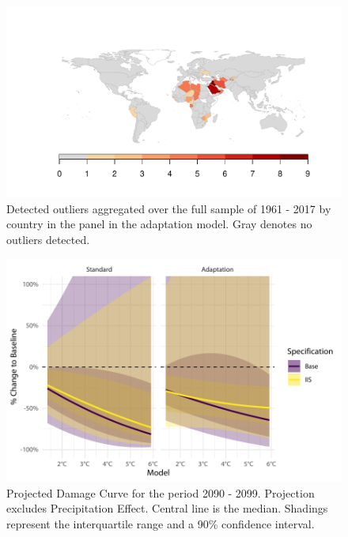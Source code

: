 \documentclass[11pt, letterpaper]{article}
\numberwithin{algorithm}{section}
\numberwithin{assumption}{section}
\numberwithin{lemma}{section}
\numberwithin{theorem}{section}
\numberwithin{corollary}{section}
\numberwithin{remark}{section}
\numberwithin{equation}{section}
\numberwithin{figure}{section}
\numberwithin{table}{section}
\begin{document}
\begin{figure}[!htbp]  \vspace{-.35in}
\centering
\includegraphics[width = \textwidth]{ctry_map_adapt.pdf}
\caption{Detected outliers aggregated over the full sample of 1961 - 2017 by country in the panel in the adaptation model. Gray denotes no outliers detected.}
\label{fig_map_app1}
\end{figure}


\begin{figure}[!htbp]  \vspace{-.35in}
\centering
\includegraphics[width = \textwidth]{projections_noprcp_main.pdf}
\caption{Projected Damage Curve for the period 2090 - 2099. Projection excludes Precipitation Effect. Central line is the median. Shadings represent the interquartile range and a 90\% confidence interval.}
\label{fig_projection}
\end{figure}
\end{document}
